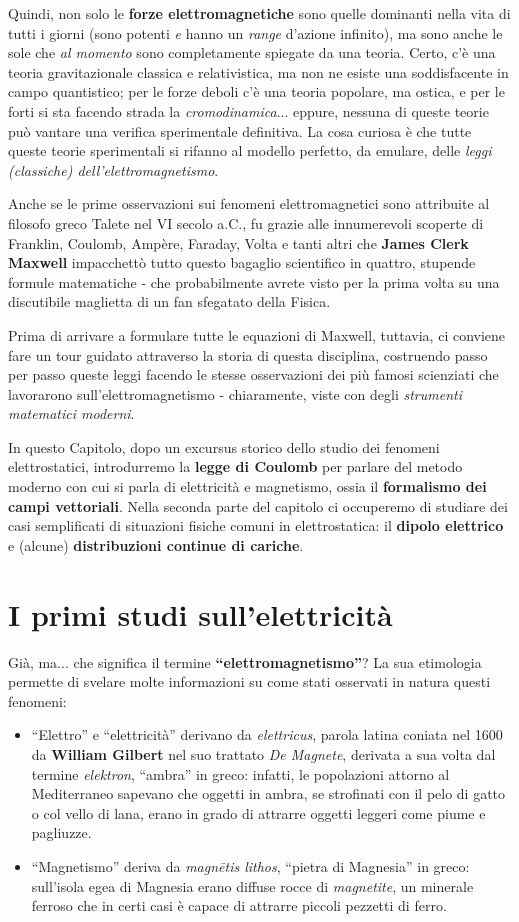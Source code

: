 Quindi, non solo le \textbf{forze elettromagnetiche} sono quelle dominanti nella vita di tutti i giorni (sono potenti \textit{e} hanno un \textit{range} d'azione infinito), ma sono anche le sole che \textit{al momento} sono completamente spiegate da una teoria. Certo, c'è una teoria gravitazionale classica e relativistica, ma non ne esiste una soddisfacente in campo quantistico; per le forze deboli c'è una teoria popolare, ma ostica, e per le forti si sta facendo strada la \textit{cromodinamica}... eppure, nessuna di queste teorie può vantare una verifica sperimentale definitiva. La cosa curiosa è che tutte queste teorie sperimentali si rifanno al modello perfetto, da emulare, delle \textit{leggi (classiche) dell'elettromagnetismo}.

Anche se le prime osservazioni sui fenomeni elettromagnetici sono attribuite al filosofo greco Talete nel VI secolo a.C., fu grazie alle innumerevoli scoperte di Franklin, Coulomb, Ampère, Faraday, Volta e tanti altri che \textbf{James Clerk Maxwell} impacchettò tutto questo bagaglio scientifico in quattro, stupende formule matematiche - che probabilmente avrete visto per la prima volta su una discutibile maglietta di un fan sfegatato della Fisica.

Prima di arrivare a formulare tutte le equazioni di Maxwell, tuttavia, ci conviene fare un tour guidato attraverso la storia di questa disciplina, costruendo passo per passo queste leggi facendo le stesse osservazioni dei più famosi scienziati che lavorarono sull'elettromagnetismo - chiaramente, viste con degli \textit{strumenti matematici moderni}.

In questo Capitolo, dopo un excursus storico dello studio dei fenomeni elettrostatici, introdurremo la \textbf{legge di Coulomb} per parlare del metodo moderno con cui si parla di elettricità e magnetismo, ossia il \textbf{formalismo dei campi vettoriali}. Nella seconda parte del capitolo ci occuperemo di studiare dei casi semplificati di situazioni fisiche comuni in elettrostatica: il \textbf{dipolo elettrico} e (alcune) \textbf{distribuzioni continue di cariche}.
\section{I primi studi sull'elettricità}
Già, ma... che significa il termine \textbf{``elettromagnetismo''}? La sua etimologia permette di svelare molte informazioni su come stati osservati in natura questi fenomeni:
\begin{itemize}
	\item ``Elettro'' e ``elettricità'' derivano da \textit{elettricus}, parola latina coniata nel 1600 da \textbf{William Gilbert} nel suo trattato \textit{De Magnete}, derivata a sua volta dal termine \textit{elektron}, ``ambra'' in greco: infatti, le popolazioni attorno al Mediterraneo sapevano che oggetti in ambra, se strofinati con il pelo di gatto o col vello di lana, erano in grado di attrarre oggetti leggeri come piume e pagliuzze.
	\item ``Magnetismo'' deriva da \textit{magnētis lithos}, ``pietra di Magnesia'' in greco: sull'isola egea di Magnesia erano diffuse rocce di \textit{magnetite}, un minerale ferroso che in certi casi è capace di attrarre piccoli pezzetti di ferro.
\end{itemize}
